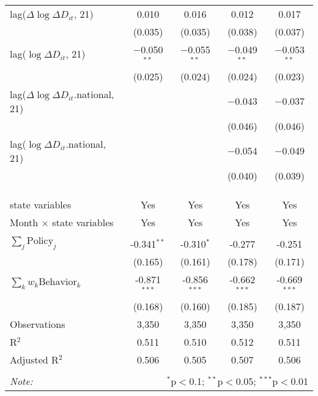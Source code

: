 \begin{tabular}{@{\extracolsep{1pt}}lcccc}
  lag($\Delta \log \Delta D_{it}$, 21) & 0.010 & 0.016 & 0.012 & 0.017 \\ 
  & (0.035) & (0.035) & (0.038) & (0.037) \\ 
  lag($\log \Delta D_{it}$, 21) & $-$0.050$^{**}$ & $-$0.055$^{**}$ & $-$0.049$^{**}$ & $-$0.053$^{**}$ \\ 
  & (0.025) & (0.024) & (0.024) & (0.023) \\ 
  lag($\Delta \log \Delta D_{it}$.national, 21) &  &  & $-$0.043 & $-$0.037 \\ 
  &  &  & (0.046) & (0.046) \\ 
  lag($\log \Delta D_{it}$.national, 21) &  &  & $-$0.054 & $-$0.049 \\ 
  &  &  & (0.040) & (0.039) \\ 
   &  &  &  &  \\ 
  &  &  &  &  \\ 
 \hline \\[-1.8ex] 
state variables & Yes & Yes & Yes & Yes \\ 
Month $\times$ state variables & Yes & Yes & Yes & Yes \\ 
\hline \\[-1.8ex] 
$\sum_j \mathrm{Policy}_j$ & -0.341$^{**}$ & -0.310$^{*}$ & -0.277 & -0.251 \\ 
 & (0.165) & (0.161) & (0.178) & (0.171) \\ 
$\sum_k w_k \mathrm{Behavior}_k$ & -0.871$^{***}$ & -0.856$^{***}$ & -0.662$^{***}$ & -0.669$^{***}$ \\ 
 & (0.168) & (0.160) & (0.185) & (0.187) \\ 
Observations & 3,350 & 3,350 & 3,350 & 3,350 \\ 
R$^{2}$ & 0.511 & 0.510 & 0.512 & 0.511 \\ 
Adjusted R$^{2}$ & 0.506 & 0.505 & 0.507 & 0.506 \\ 
\hline 
\hline \\[-1.8ex] 
\textit{Note:}  & \multicolumn{4}{r}{$^{*}$p$<$0.1; $^{**}$p$<$0.05; $^{***}$p$<$0.01} \\ 
\end{tabular} 